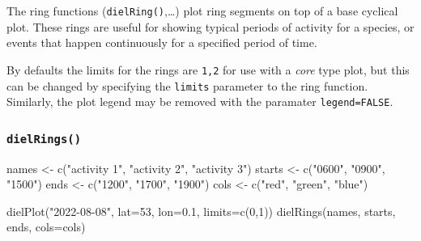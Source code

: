 \documentclass[
]{book}
\newenvironment{Shaded}{\begin{snugshade}}{\end{snugshade}}
\newcommand{\AttributeTok}[1]{\textcolor[rgb]{0.77,0.63,0.00}{#1}}
\newcommand{\DecValTok}[1]{\textcolor[rgb]{0.00,0.00,0.81}{#1}}
\newcommand{\FloatTok}[1]{\textcolor[rgb]{0.00,0.00,0.81}{#1}}
\newcommand{\FunctionTok}[1]{\textcolor[rgb]{0.00,0.00,0.00}{#1}}
\newcommand{\NormalTok}[1]{#1}
\newcommand{\OtherTok}[1]{\textcolor[rgb]{0.56,0.35,0.01}{#1}}
\newcommand{\StringTok}[1]{\textcolor[rgb]{0.31,0.60,0.02}{#1}}
\begin{document}
The ring functions (\texttt{dielRing()},\ldots) plot ring segments on top of a base cyclical plot. These rings are useful for showing typical periods of activity for a species, or events that happen continuously for a specified period of time.

By defaults the limits for the rings are \texttt{1,2} for use with a \emph{core} type plot, but this can be changed by specifying the \texttt{limits} parameter to the ring function. Similarly, the plot legend may be removed with the paramater \texttt{legend=FALSE}.

\hypertarget{dielrings}{%
\subsubsection{\texorpdfstring{\texttt{dielRings()}}{dielRings()}}\label{dielrings}}

\begin{Shaded}
\begin{Highlighting}[]
\NormalTok{names }\OtherTok{\textless{}{-}} \FunctionTok{c}\NormalTok{(}\StringTok{"activity 1"}\NormalTok{, }\StringTok{"activity 2"}\NormalTok{, }\StringTok{"activity 3"}\NormalTok{)}
\NormalTok{starts }\OtherTok{\textless{}{-}} \FunctionTok{c}\NormalTok{(}\StringTok{"0600"}\NormalTok{, }\StringTok{"0900"}\NormalTok{, }\StringTok{"1500"}\NormalTok{)}
\NormalTok{ends }\OtherTok{\textless{}{-}} \FunctionTok{c}\NormalTok{(}\StringTok{"1200"}\NormalTok{, }\StringTok{"1700"}\NormalTok{, }\StringTok{"1900"}\NormalTok{)}
\NormalTok{cols }\OtherTok{\textless{}{-}} \FunctionTok{c}\NormalTok{(}\StringTok{"red"}\NormalTok{, }\StringTok{"green"}\NormalTok{, }\StringTok{"blue"}\NormalTok{)}

\FunctionTok{dielPlot}\NormalTok{(}\StringTok{"2022{-}08{-}08"}\NormalTok{, }\AttributeTok{lat=}\DecValTok{53}\NormalTok{, }\AttributeTok{lon=}\FloatTok{0.1}\NormalTok{, }\AttributeTok{limits=}\FunctionTok{c}\NormalTok{(}\DecValTok{0}\NormalTok{,}\DecValTok{1}\NormalTok{))}
\FunctionTok{dielRings}\NormalTok{(names, starts, ends, }\AttributeTok{cols=}\NormalTok{cols)}
\end{Highlighting}
\end{Shaded}
\end{document}
